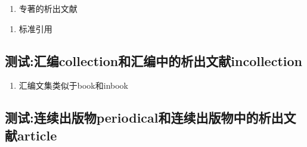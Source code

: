 \begin{refsection}
\begin{enumerate}
\end{enumerate}

\printbibliography[heading=bibliography,title=【专著】]
\end{refsection}


\begin{refsection}

\begin{enumerate}
  \item 专著的析出文献\cite{马克思2013-302-302}\cite{王夫之2011-1109-1109}
  \cite{BUSECK1980-117-211,MARTIN1996-85-96,WEINSTEIN1974-745-772,白书农1998-146-163,陈晋镳1980-56-114,程根伟1999-32-36,楼梦麟2011-11-12,马克思1982-505-505,马克思2013-302-302,钟文发1996-468-471,1977-49-49,1988-590-590,王夫之2011-1109-1109}
\end{enumerate}

\printbibliography[heading=bibliography,title=【专著中的析出文献】]
\end{refsection}

\begin{refsection}

\begin{enumerate}
  \item 标准引用\cite{国家标准局信息分类编码研究所1988-59-92,国家环境保护局科技标准司1996-2-3,全国广播电视标准化技术委员会2007-1-1,全国文献工作标准化委员会第七分委员会1986--,全国信息文献标准化技术委员会2010-3-3,中华人民共和国国家质量监督检验检疫总局2015,standardinfoiso158}
\end{enumerate}

\printbibliography[heading=bibliography,title=【标准】]
\end{refsection}

\subsection{测试:汇编collection和汇编中的析出文献incollection}
\begin{refsection}

\begin{enumerate}
  \item 汇编文集类似于book和inbook\cite{韩吉人1985-90-99}\cite{中国职工教育研究会1985--}
\end{enumerate}

\printbibliography[heading=bibliography,title=【汇编或文集】]
\end{refsection}


\subsection{测试:连续出版物periodical和连续出版物中的析出文献article}


